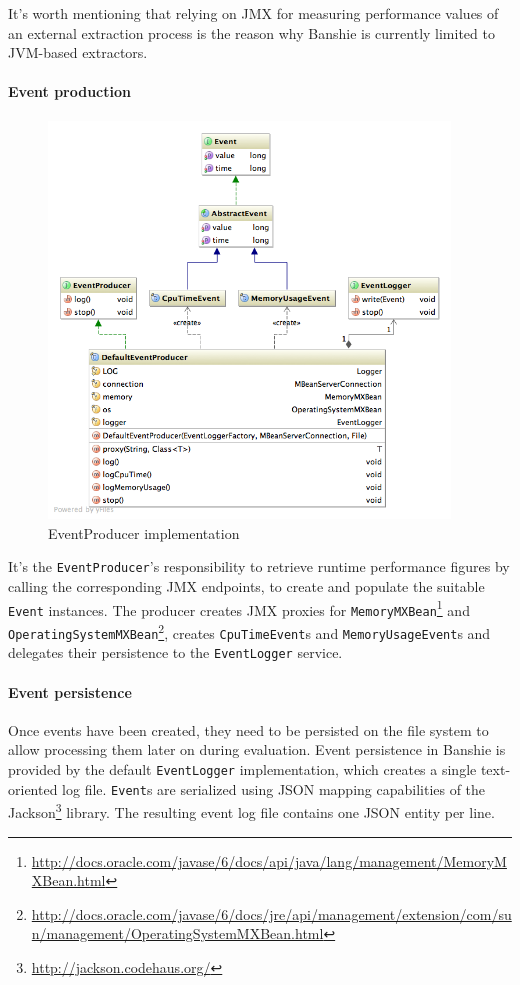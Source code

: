It's worth mentioning that relying on \gls{JMX} for measuring performance values of an external extraction process is the reason why Banshie is currently limited to JVM-based extractors.

\newpage
\paragraph{Event production}
\begin{figure}[H]
\centering
\includegraphics[width=0.95\textwidth, trim=20px 20px 0 0, clip=true]{event.png}
\caption{EventProducer implementation}
\end{figure}

It's the \texttt{EventProducer}'s responsibility to retrieve runtime performance figures by calling the corresponding \gls{JMX} endpoints, to create and populate the suitable \texttt{Event} instances. The producer creates \gls{JMX} proxies for \texttt{MemoryMXBean}\footnote{\url{http://docs.oracle.com/javase/6/docs/api/java/lang/management/MemoryMXBean.html}} and \texttt{OperatingSystemMXBean}\footnote{\url{http://docs.oracle.com/javase/6/docs/jre/api/management/extension/com/sun/management/OperatingSystemMXBean.html}}, creates \texttt{CpuTimeEvent}s and \texttt{MemoryUsageEvent}s and delegates their persistence to the \texttt{EventLogger} service.

\paragraph{Event persistence}
Once events have been created, they need to be persisted on the file system to allow processing them later on during evaluation. Event persistence in Banshie is provided by the default \texttt{EventLogger} implementation, which creates a single text-oriented log file. \texttt{Event}s are serialized using \gls{JSON} mapping capabilities of the Jackson\footnote{\url{http://jackson.codehaus.org/}} library. The resulting event log file contains one \gls{JSON} entity per line.

